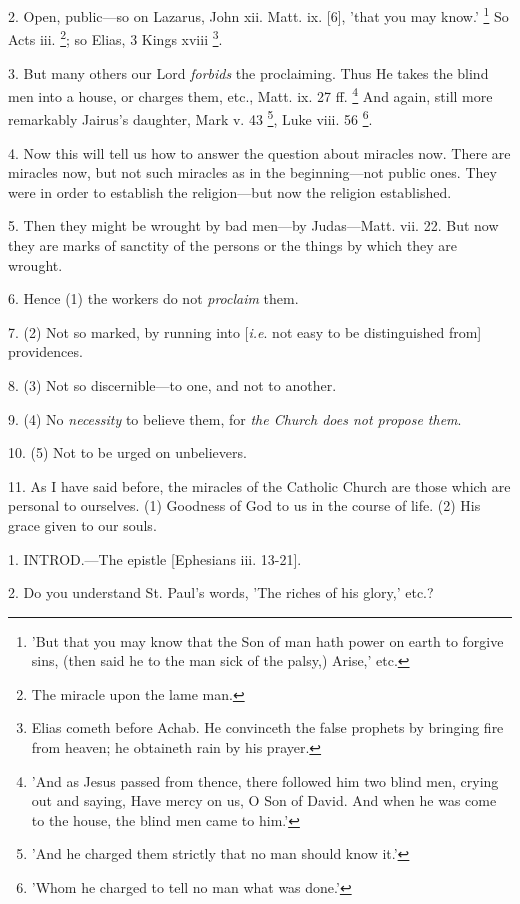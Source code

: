 2. Open, public—so on Lazarus, John xii. Matt.
ix. [6], 'that you may know.' \footnote{'But that you may know
that the Son of man hath power on earth to forgive sins, (then said he
to the man sick of the palsy,) Arise,' etc.} So Acts iii. \footnote{The miracle upon the
lame man.};
so Elias, 3 Kings xviii \footnote{Elias cometh before
Achab. He convinceth the false prophets by bringing fire from heaven;
he obtaineth rain by his prayer.}.

3. But many others our Lord \emph{forbids} the
proclaiming. Thus He takes the blind men into a house, or charges
them, etc., Matt. ix. 27 ff. \footnote{'And as Jesus passed
from thence, there followed him two blind men, crying out and saying,
Have mercy on us, O Son of David. And when he was come to the house,
the blind men came to him.'} And again, still more remarkably Jairus's daughter, Mark v. 43
\footnote{'And he charged them
strictly that no man should know it.'}, Luke viii. 56 \footnote{'Whom he charged to tell
no man what was done.'}.

4. Now this will tell us how to answer the
question about miracles now. There are miracles now, but not such
miracles as in the beginning—not public ones. They were in order to
establish the religion—but now the religion established.

5. Then they might be wrought by bad men—by
Judas—Matt. vii. 22. But now they are marks of sanctity of the
persons or the things by which they are wrought.

6. Hence (1) the workers do not \emph{proclaim}
them.

7. (2) Not so marked, by running into [\emph{i.e}.
not easy to be distinguished from] providences.

8. (3) Not so discernible—to one, and not to
another.

9. (4) No \emph{necessity} to believe them, for \emph{the
Church does not propose them}.

10. (5) Not to be urged on unbelievers.

11. As I have said before, the miracles of the
Catholic Church are those which are personal to ourselves. (1)
Goodness of God to us in the course of life. (2) His grace given to
our souls.


1. INTROD.—The
epistle [Ephesians iii. 13-21].

2. Do you understand St. Paul's words, 'The
riches of his glory,' etc.?

